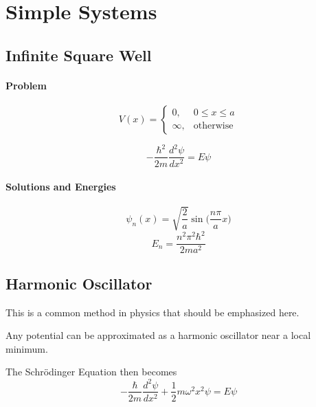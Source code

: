 \chapter{Simple Systems}

\section{Infinite Square Well}
\subsubsection{Problem}
\begin{equation} \label{eq:infinite-potential}
    V(x) = \left\{\begin{array}{rc}
        0, &  0\leq x \leq a\\
        \infty, & \text{otherwise}
    \end{array}\right.
\end{equation}

\begin{equation}\label{eq:SE-infinitewell}
    -\frac{\hbar^2}{2m}\frac{d^2\psi}{dx^2} = E\psi
\end{equation}
\subsubsection{Solutions and Energies}
\begin{equation}\label{eq:infinitewell-solutions}
    \psi_n(x) = \sqrt{\frac{2}{a}}\sin{\Big(\frac{n\pi}{a}x\Big)}
\end{equation}
\begin{equation}\label{eq:infinitewell-energies}
    E_n = \frac{n^2\pi^2\hbar^2}{2ma^2}
\end{equation}

\section{Harmonic Oscillator}
This is a common method in physics that should be emphasized here.

\begin{theorem}
Any potential can be approximated as a harmonic oscillator near a local minimum.
\end{theorem}

The Schr{\"o}dinger Equation then becomes
\begin{equation}\label{eq:HO-SE}
    -\frac{\hbar}{2m} \frac{d^2\psi}{dx^2} + \frac{1}{2} m\omega^2 x^2 \psi = E \psi
\end{equation}

